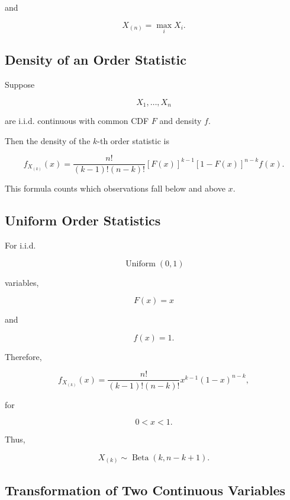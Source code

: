 and

\[
X_{(n)}
=
\max_i X_i.
\]

\subsection{Density of an Order Statistic}
\label{subsec:density-order-statistic}

Suppose

\[
X_1,\ldots,X_n
\]

are i.i.d. continuous with common CDF \(F\) and density \(f\).

Then the density of the \(k\)-th order statistic is

\[
\boxed{
f_{X_{(k)}}(x)
=
\frac{
n!
}{
(k-1)!(n-k)!
}
[F(x)]^{k-1}
[1-F(x)]^{n-k}
f(x).
}
\]

This formula counts which observations fall below and above \(x\).

\subsection{Uniform Order Statistics}
\label{subsec:uniform-order-statistics}

For i.i.d.

\[
\operatorname{Uniform}(0,1)
\]

variables,

\[
F(x)=x
\]

and

\[
f(x)=1.
\]

Therefore,

\[
\boxed{
f_{X_{(k)}}(x)
=
\frac{
n!
}{
(k-1)!(n-k)!
}
x^{k-1}
(1-x)^{n-k},
}
\]

for

\[
0<x<1.
\]

Thus,

\[
\boxed{
X_{(k)}
\sim
\operatorname{Beta}
(k,n-k+1).
}
\]

\subsection{Transformation of Two Continuous Variables}
\label{subsec:two-variable-transformations}

